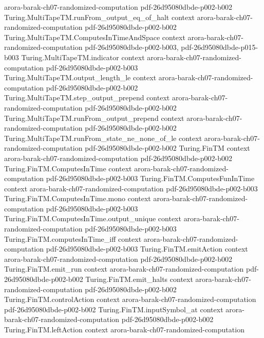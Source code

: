 \begin{theorem}
  {arora-barak-ch07-randomized-computation}
  {pdf-26d95080dbde-p002-b002}
\proofstep
  {Turing.MultiTapeTM.runFrom_output_eq_of_halt}
  {context}
  {arora-barak-ch07-randomized-computation}
  {pdf-26d95080dbde-p002-b002}
\proofstep
  {Turing.MultiTapeTM.ComputesInTimeAndSpace}
  {context}
  {arora-barak-ch07-randomized-computation}
  {pdf-26d95080dbde-p002-b003,
    pdf-26d95080dbde-p015-b003}
\proofstep
  {Turing.MultiTapeTM.indicator}
  {context}
  {arora-barak-ch07-randomized-computation}
  {pdf-26d95080dbde-p002-b003}
\proofstep
  {Turing.MultiTapeTM.output_length_le}
  {context}
  {arora-barak-ch07-randomized-computation}
  {pdf-26d95080dbde-p002-b002}
\proofstep
  {Turing.MultiTapeTM.step_output_prepend}
  {context}
  {arora-barak-ch07-randomized-computation}
  {pdf-26d95080dbde-p002-b002}
\proofstep
  {Turing.MultiTapeTM.runFrom_output_prepend}
  {context}
  {arora-barak-ch07-randomized-computation}
  {pdf-26d95080dbde-p002-b002}
\proofstep
  {Turing.MultiTapeTM.runFrom_state_ne_none_of_le}
  {context}
  {arora-barak-ch07-randomized-computation}
  {pdf-26d95080dbde-p002-b002}
\proofstep
  {Turing.FinTM}
  {context}
  {arora-barak-ch07-randomized-computation}
  {pdf-26d95080dbde-p002-b002}
\proofstep
  {Turing.FinTM.ComputesInTime}
  {context}
  {arora-barak-ch07-randomized-computation}
  {pdf-26d95080dbde-p002-b003}
\proofstep
  {Turing.FinTM.ComputesFunInTime}
  {context}
  {arora-barak-ch07-randomized-computation}
  {pdf-26d95080dbde-p002-b003}
\proofstep
  {Turing.FinTM.ComputesInTime.mono}
  {context}
  {arora-barak-ch07-randomized-computation}
  {pdf-26d95080dbde-p002-b003}
\proofstep
  {Turing.FinTM.ComputesInTime.output_unique}
  {context}
  {arora-barak-ch07-randomized-computation}
  {pdf-26d95080dbde-p002-b003}
\proofstep
  {Turing.FinTM.computesInTime_iff}
  {context}
  {arora-barak-ch07-randomized-computation}
  {pdf-26d95080dbde-p002-b003}
\proofstep
  {Turing.FinTM.emitAction}
  {context}
  {arora-barak-ch07-randomized-computation}
  {pdf-26d95080dbde-p002-b002}
\proofstep
  {Turing.FinTM.emit_run}
  {context}
  {arora-barak-ch07-randomized-computation}
  {pdf-26d95080dbde-p002-b002}
\proofstep
  {Turing.FinTM.emit_halts}
  {context}
  {arora-barak-ch07-randomized-computation}
  {pdf-26d95080dbde-p002-b002}
\proofstep
  {Turing.FinTM.controlAction}
  {context}
  {arora-barak-ch07-randomized-computation}
  {pdf-26d95080dbde-p002-b002}
\proofstep
  {Turing.FinTM.inputSymbol_at}
  {context}
  {arora-barak-ch07-randomized-computation}
  {pdf-26d95080dbde-p002-b002}
\proofstep
  {Turing.FinTM.leftAction}
  {context}
  {arora-barak-ch07-randomized-computation}

\end{theorem}
